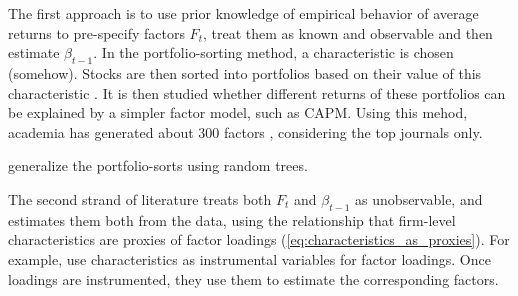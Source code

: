 	The first approach is to use prior knowledge of empirical behavior of average returns to pre-specify factors $F_t$, treat them as known and observable and then estimate $\beta_{t-1}$. In the portfolio-sorting method, a characteristic is chosen (somehow). Stocks are then sorted into portfolios based on their value of this characteristic \citep{fama1993common}. It is then studied whether different returns of these portfolios can be explained by a simpler factor model, such as CAPM. Using this mehod, academia has generated about 300 factors \citep{harvey2016and}, considering the top journals only.
	
	\cite{bryzgalova2019forest} generalize the portfolio-sorts using random trees.     
	
	The second strand of literature treats both $F_t$ and $\beta_{t-1}$ as unobservable, and estimates them both from the data, using the  relationship that firm-level characteristics are proxies of factor loadings (\ref{eq:characteristics_as_proxies}). For example, \cite{kelly2019characteristics} use characteristics as instrumental variables for factor loadings. Once loadings are instrumented, they use them to estimate the corresponding factors. 
	
    
	
	

	
	   
	
	   
	



